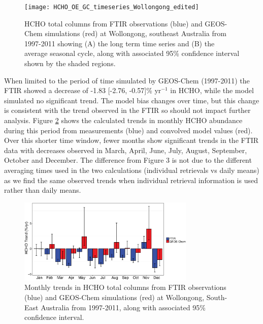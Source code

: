 \documentclass[draft]{agujournal}
\begin{document}
\begin{figure}[h!]
  \begin{center}
    \texttt{[image: HCHO\_OE\_GC\_timeseries\_Wollongong\_edited]}
      \caption{HCHO total columns from FTIR observations (blue) and GEOS-Chem simulations (red) at Wollongong, southeast Australia from 1997-2011 showing (A) the long term time series and (B) the average seasonal cycle, along with associated 95\% confidence interval shown by the shaded regions.}
  \label{fig:gc_ts}
  \end{center}
\end{figure}

When limited to the period of time simulated by GEOS-Chem (1997-2011) the FTIR showed a decrease of -1.83 [-2.76, -0.57]\% yr$^{-1}$ in HCHO, while the model simulated no significant trend. The model bias changes over time, but this change is consistent with the trend observed in the FTIR so should not impact further analysis. Figure \ref{fig:gc_trends} shows the calculated trends in monthly HCHO abundance during this period from measurements (blue) and convolved model values (red). Over this shorter time window, fewer months show significant trends in the FTIR data with decreases observed in March, April, June, July, August, September, October and December. The difference from Figure 3 is not due to the different averaging times used in the two calculations (individual retrievals vs daily means) as we find the same observed trends when individual retrieval information is used rather than daily means.

\begin{figure}[h!]
  \begin{center}
    \includegraphics[width=0.75\textwidth]{HCHO_OE_GC_Monthly_Trends_Wollongong}
      \caption{Monthly trends in HCHO total columns from FTIR observations (blue) and GEOS-Chem simulations (red) at Wollongong, South-East Australia from 1997-2011, along with associated 95\% confidence interval.}
  \label{fig:gc_trends}
  \end{center}
\end{figure}
\end{document}
